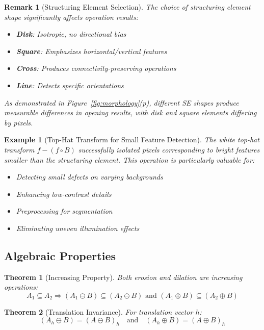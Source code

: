 \documentclass[a4paper, 11pt]{article}
\newtheorem{theorem}{Theorem}[section]
\newtheorem{example}{Example}[section]
\newtheorem{remark}{Remark}[section]
\begin{document}
\begin{remark}[Structuring Element Selection]
The choice of structuring element shape significantly affects operation results:
\begin{itemize}
\item \textbf{Disk}: Isotropic, no directional bias
\item \textbf{Square}: Emphasizes horizontal/vertical features
\item \textbf{Cross}: Produces connectivity-preserving operations
\item \textbf{Line}: Detects specific orientations
\end{itemize}
As demonstrated in Figure~\ref{fig:morphology}(p), different SE shapes produce measurable
differences in opening results, with disk and square elements differing by
 pixels.
\end{remark}

\begin{example}[Top-Hat Transform for Small Feature Detection]
The white top-hat transform $f - (f \circ B)$ successfully isolated
 pixels corresponding to bright features smaller than the
structuring element. This operation is particularly valuable for:
\begin{itemize}
\item Detecting small defects on varying backgrounds
\item Enhancing low-contrast details
\item Preprocessing for segmentation
\item Eliminating uneven illumination effects
\end{itemize}
\end{example}

\subsection{Algebraic Properties}

\begin{theorem}[Increasing Property]
Both erosion and dilation are increasing operations:
\begin{equation}
A_1 \subseteq A_2 \Rightarrow (A_1 \ominus B) \subseteq (A_2 \ominus B) \text{ and }
(A_1 \oplus B) \subseteq (A_2 \oplus B)
\end{equation}
\end{theorem}

\begin{theorem}[Translation Invariance]
For translation vector $h$:
\begin{equation}
(A_h \ominus B) = (A \ominus B)_h \quad \text{and} \quad (A_h \oplus B) = (A \oplus B)_h
\end{equation}
\end{theorem}
\end{document}
